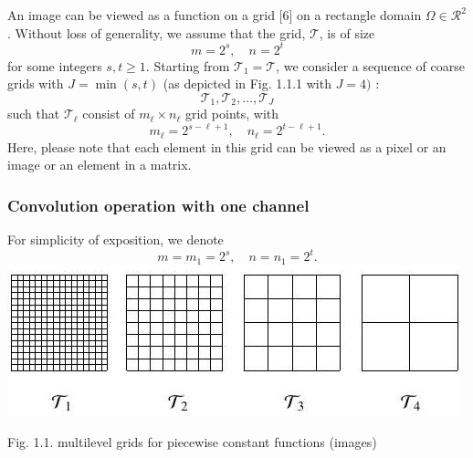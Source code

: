 \documentclass[10pt]{article}
\begin{document}
An image can be viewed as a function on a grid [6] on a rectangle domain $\Omega \in \mathcal{R}^{2}$. Without loss of generality, we assume that the grid, $\mathcal{T}$, is of size
$$
m=2^{s}, \quad n=2^{t}
$$
for some integers $s, t \geq 1$. Starting from $\mathcal{T}_{1}=\mathcal{T}$, we consider a sequence of coarse grids with $J=\min (s, t)$ (as depicted in Fig. 1.1.1 with $J=4)$ :
$$
\mathcal{T}_{1}, \mathcal{T}_{2}, \ldots, \mathcal{T}_{J}
$$
such that $\mathcal{T}_{\ell}$ consist of $m_{\ell} \times n_{\ell}$ grid points, with
$$
m_{\ell}=2^{s-\ell+1}, \quad n_{\ell}=2^{t-\ell+1} .
$$
Here, please note that each element in this grid can be viewed as a pixel or an image or an element in a matrix.

\subsubsection{Convolution operation with one channel}
For simplicity of exposition, we denote
$$
m=m_{1}=2^{s}, \quad n=n_{1}=2^{t} .
$$
\includegraphics[max width=\textwidth]{2022_01_06_b5ce182ed1bd5f482e5bg-04}

Fig. 1.1. multilevel grids for piecewise constant functions (images)
\end{document}
